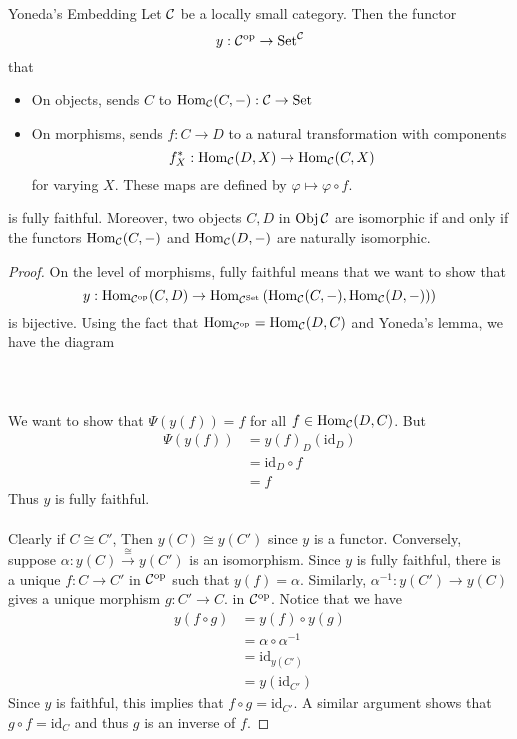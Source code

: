 \documentclass[a4paper]{article}
\begin{document}
\begin{crl}{Yoneda's Embedding}{} Let $\mathcal{C}$ be a locally small category. Then the functor $$y:\mathcal{C}^{\text{op}}\to\text{Set}^{\mathcal{C}}$$ that 
\begin{itemize}
\item On objects, sends $C$ to $\operatorname{Hom}_{\mathcal{C}}(C,-):\mathcal{C}\to\text{Set}$
\item On morphisms, sends $f:C\to D$ to a natural transformation with components $$f_X^\ast:\operatorname{Hom}_{\mathcal{C}}(D,X)\to\operatorname{Hom}_{\mathcal{C}}(C,X)$$ for varying $X$. These maps are defined by $\varphi\mapsto\varphi\circ f$. 
\end{itemize}
is fully faithful. Moreover, two objects $C,D$ in $\operatorname{Obj}\mathcal{C}$ are isomorphic if and only if the functors $\operatorname{Hom}_{\mathcal{C}}(C,-)$ and $\operatorname{Hom}_{\mathcal{C}}(D,-)$ are naturally isomorphic. \tcbline
\begin{proof}
On the level of morphisms, fully faithful means that we want to show that $$y:\operatorname{Hom}_{\mathcal{C}^{\text{op}}}(C,D)\to\operatorname{Hom}_{\mathcal{C}^{\text{Set}}}\left(\operatorname{Hom}_{\mathcal{C}}(C,-),\operatorname{Hom}_{\mathcal{C}}(D,-))\right)$$ is bijective. Using the fact that $\operatorname{Hom}_{\mathcal{C}^{\text{op}}}=\operatorname{Hom}_{\mathcal{C}}(D,C)$ and Yoneda's lemma, we have the diagram \\~\\
\\~\\ We want to show that $\Psi(y(f))=f$ for all $f\in\operatorname{Hom}_{\mathcal{C}}(D,C)$. But 
\begin{align*}
\Psi(y(f))&=y(f)_D(\text{id}_D)\\
&=\text{id}_D\circ f\\
&=f
\end{align*}
Thus $y$ is fully faithful. \\~\\
Clearly if $C\cong C'$, Then $y(C)\cong y(C')$ since $y$ is a functor. Conversely, suppose $\alpha:y(C)\overset{\cong}{\rightarrow}y(C')$ is an isomorphism. Since $y$ is fully faithful, there is a unique $f:C\to C'$ in $\mathcal{C}^{\text{op}}$ such that $y(f)=\alpha$. Similarly, $\alpha^{-1}:y(C')\to y(C)$ gives a unique morphism $g:C'\to C$. in $\mathcal{C}^{\text{op}}$. Notice that we have
\begin{align*}
y(f\circ g)&=y(f)\circ y(g)\\
&=\alpha\circ\alpha^{-1}\\
&=\text{id}_{y(C')}\\
&=y(\text{id}_{C'})
\end{align*}
Since $y$ is faithful, this implies that $f\circ g=\text{id}_{C'}$. A similar argument shows that $g\circ f=\text{id}_C$ and thus $g$ is an inverse of $f$. 
\end{proof}
\end{crl}
\end{document}
